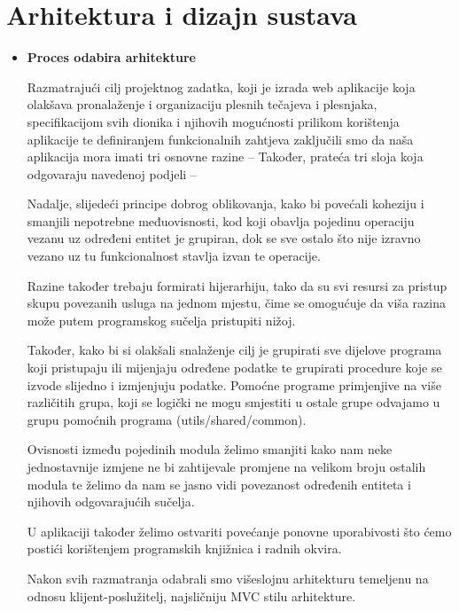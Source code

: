 \chapter{Arhitektura i dizajn sustava}

	\begin{itemize}
		\item \textbf{Proces odabira arhitekture}

Razmatrajući cilj projektnog zadatka, koji je izrada web aplikacije koja olakšava pronalaženje i organizaciju plesnih tečajeva i plesnjaka, specifikacijom svih dionika i njihovih mogućnosti prilikom korištenja aplikacije te definiranjem funkcionalnih zahtjeva zaključili smo da naša aplikacija mora imati tri osnovne razine –  Također, prateća tri sloja koja odgovaraju navedenoj podjeli – 

Nadalje, slijedeći principe dobrog oblikovanja, kako bi povećali koheziju i smanjili nepotrebne međuovisnosti, kod koji obavlja pojedinu operaciju vezanu uz određeni entitet je grupiran, dok se sve ostalo što nije izravno vezano uz tu funkcionalnost stavlja izvan te operacije. 

Razine također trebaju formirati hijerarhiju, tako da su svi resursi za pristup skupu povezanih usluga na jednom mjestu, čime se omogućuje da viša razina može putem programskog sučelja pristupiti nižoj. 

Također, kako bi si olakšali snalaženje cilj je grupirati sve dijelove programa koji pristupaju ili mijenjaju određene podatke te grupirati procedure koje se izvode slijedno i izmjenjuju podatke. Pomoćne programe primjenjive na više različitih grupa, koji se logički ne mogu smjestiti u ostale grupe odvajamo u grupu pomoćnih programa (utils/shared/common).

Ovisnosti između pojedinih modula želimo smanjiti kako nam neke jednostavnije izmjene ne bi zahtijevale promjene na velikom broju ostalih modula te želimo da nam se jasno vidi povezanost određenih entiteta i njihovih odgovarajućih sučelja. 

U aplikaciji također želimo ostvariti povećanje ponovne uporabivosti što ćemo postići korištenjem programskih knjižnica i radnih okvira. 

Nakon svih razmatranja odabrali smo višeslojnu arhitekturu temeljenu na odnosu klijent-poslužitelj, najsličniju MVC stilu arhitekture.



\end{itemize}
